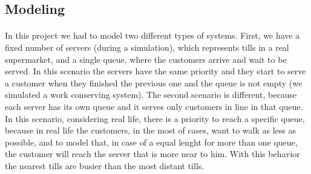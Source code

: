 \subsection{Modeling}
\paragraph{} 
In this project we had to model two different types of systems. First, we have a fixed number of servers (during a simulation), which represents tills in a real supermarket, and a single queue, where the customers arrive and wait to be served. In this scenario the servers have the same priority and they start to serve a customer when they finished the previous one and the queue is not empty (we simulated a work conserving system). The second scenario is different, because each server has its own queue and it serves only customers in line in that queue. In this scenario, considering real life, there is a priority to reach a specific queue, because in real life the customers, in the most of cases, want to walk as less as possible, and to model that, in case of a equal lenght for more than one queue, the customer will reach the server that is more near to him. With this behavior the nearest tills are busier than the most distant tills. 